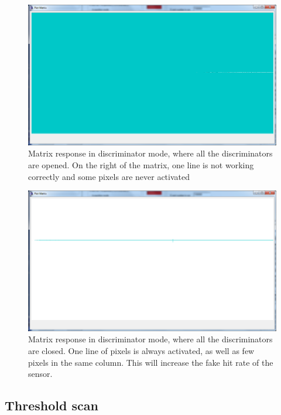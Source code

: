   \begin{figure}[!h]
    \centering
    \includegraphics[width=\textwidth]{Pictures/labTests/th0.png}
    \caption{Matrix response in discriminator mode, where all the discriminators are opened. On the right of the matrix, one line is not working correctly and some pixels are never activated}
    \label{fig:openPixel}
  \end{figure}
   
  \begin{figure}[!h]
    \centering
    \includegraphics[width=\textwidth]{Pictures/labTests/th255.png}
    \caption{Matrix response in discriminator mode, where all the discriminators are closed. One line of pixels is always activated, as well as few pixels in the same column. This will increase the fake hit rate of the sensor.}
    \label{fig:closePixel}
  \end{figure}

  \subsection{Threshold scan}

